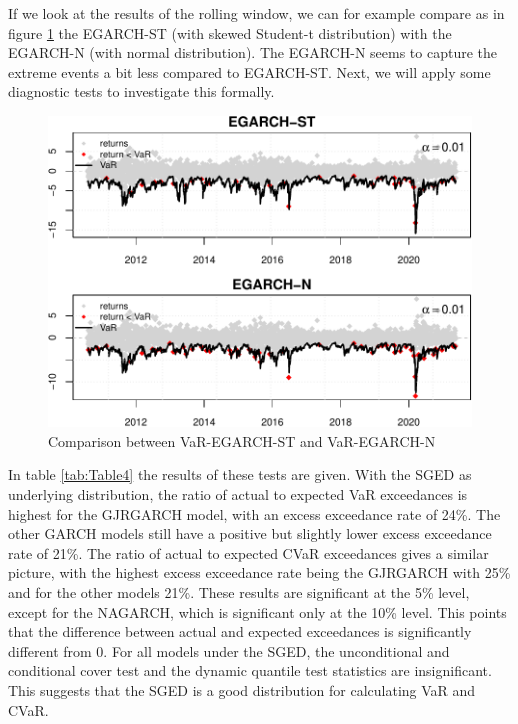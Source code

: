 \documentclass[a4paper, nobind]{templates/ociamthesis}
\begin{document}
\noindent If we look at the results of the rolling window, we can for example compare as in figure \ref{fig:figurebacktests2} the EGARCH-ST (with skewed Student-t distribution) with the EGARCH-N (with normal distribution). The EGARCH-N seems to capture the extreme events a bit less compared to EGARCH-ST. Next, we will apply some diagnostic tests to investigate this formally.~\\

\newpage

\begin{figure}[h]

{\centering \includegraphics[width=0.9\linewidth]{_main_files/figure-latex/figurebacktests2-1} 

}

\caption{Comparison between VaR-EGARCH-ST and VaR-EGARCH-N}\label{fig:figurebacktests2}
\end{figure}

\noindent In table \ref{tab:Table4} the results of these tests are given. With the SGED as underlying distribution, the ratio of actual to expected VaR exceedances is highest for the GJRGARCH model, with an excess exceedance rate of 24\%. The other GARCH models still have a positive but slightly lower excess exceedance rate of 21\%. The ratio of actual to expected CVaR exceedances gives a similar picture, with the highest excess exceedance rate being the GJRGARCH with 25\% and for the other models 21\%. These results are significant at the 5\% level, except for the NAGARCH, which is significant only at the 10\% level. This points that the difference between actual and expected exceedances is significantly different from 0. For all models under the SGED, the unconditional and conditional cover test and the dynamic quantile test statistics are insignificant. This suggests that the SGED is a good distribution for calculating VaR and CVaR.~\\
\end{document}
